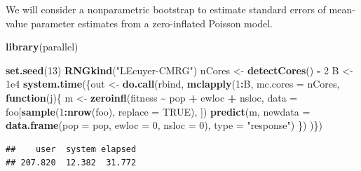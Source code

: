 \documentclass[
  ignorenonframetext,
]{beamer}
\newenvironment{Shaded}{\begin{snugshade}}{\end{snugshade}}
\newcommand{\AttributeTok}[1]{\textcolor[rgb]{0.13,0.29,0.53}{#1}}
\newcommand{\ConstantTok}[1]{\textcolor[rgb]{0.56,0.35,0.01}{#1}}
\newcommand{\ControlFlowTok}[1]{\textcolor[rgb]{0.13,0.29,0.53}{\textbf{#1}}}
\newcommand{\DecValTok}[1]{\textcolor[rgb]{0.00,0.00,0.81}{#1}}
\newcommand{\FloatTok}[1]{\textcolor[rgb]{0.00,0.00,0.81}{#1}}
\newcommand{\FunctionTok}[1]{\textcolor[rgb]{0.13,0.29,0.53}{\textbf{#1}}}
\newcommand{\NormalTok}[1]{#1}
\newcommand{\OtherTok}[1]{\textcolor[rgb]{0.56,0.35,0.01}{#1}}
\newcommand{\SpecialCharTok}[1]{\textcolor[rgb]{0.81,0.36,0.00}{\textbf{#1}}}
\newcommand{\StringTok}[1]{\textcolor[rgb]{0.31,0.60,0.02}{#1}}
\begin{document}
\begin{frame}[fragile]{}
\protect\hypertarget{section-44}{}
We will consider a nonparametric bootstrap to estimate standard errors
of mean-value parameter estimates from a zero-inflated Poisson model.

\vspace{12pt}
\tiny

\begin{Shaded}
\begin{Highlighting}[]
\FunctionTok{library}\NormalTok{(parallel)}
\end{Highlighting}
\end{Shaded}

\begin{Shaded}
\begin{Highlighting}[]
\FunctionTok{set.seed}\NormalTok{(}\DecValTok{13}\NormalTok{)}
\FunctionTok{RNGkind}\NormalTok{(}\StringTok{"L\textquotesingle{}Ecuyer{-}CMRG"}\NormalTok{)}
\NormalTok{nCores }\OtherTok{\textless{}{-}} \FunctionTok{detectCores}\NormalTok{() }\SpecialCharTok{{-}} \DecValTok{2}
\NormalTok{B }\OtherTok{\textless{}{-}} \FloatTok{1e4}
\FunctionTok{system.time}\NormalTok{(\{out }\OtherTok{\textless{}{-}} \FunctionTok{do.call}\NormalTok{(rbind, }\FunctionTok{mclapply}\NormalTok{(}\DecValTok{1}\SpecialCharTok{:}\NormalTok{B, }\AttributeTok{mc.cores =}\NormalTok{ nCores, }
                               \ControlFlowTok{function}\NormalTok{(j)\{}
\NormalTok{    m }\OtherTok{\textless{}{-}} \FunctionTok{zeroinfl}\NormalTok{(fitness }\SpecialCharTok{\textasciitilde{}}\NormalTok{ pop }\SpecialCharTok{+}\NormalTok{ ewloc }\SpecialCharTok{+}\NormalTok{ nsloc, }
                  \AttributeTok{data =}\NormalTok{ foo[}\FunctionTok{sample}\NormalTok{(}\DecValTok{1}\SpecialCharTok{:}\FunctionTok{nrow}\NormalTok{(foo), }\AttributeTok{replace =} \ConstantTok{TRUE}\NormalTok{), ])}
    \FunctionTok{predict}\NormalTok{(m, }\AttributeTok{newdata =} \FunctionTok{data.frame}\NormalTok{(}\AttributeTok{pop =}\NormalTok{ pop, }\AttributeTok{ewloc =} \DecValTok{0}\NormalTok{, }\AttributeTok{nsloc =} \DecValTok{0}\NormalTok{), }
            \AttributeTok{type =} \StringTok{"response"}\NormalTok{)}
\NormalTok{  \})}
\NormalTok{)\})}
\end{Highlighting}
\end{Shaded}

\begin{verbatim}
##    user  system elapsed 
## 207.820  12.382  31.772
\end{verbatim}
\end{frame}
\end{document}
